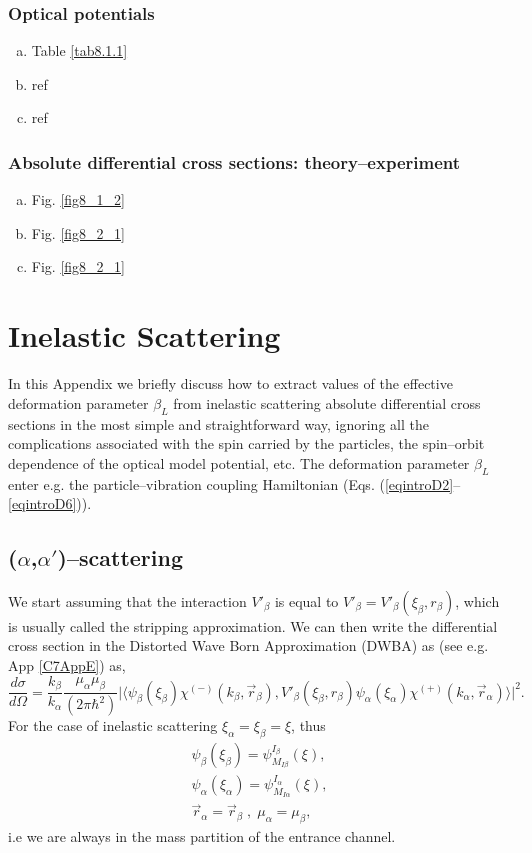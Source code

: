 \begin{subappendices}
\subsubsection{Optical potentials}
\begin{enumerate}[a)]
\item{Table \ref{tab8.1.1}}
\item{ref}
\item{ref}
\end{enumerate}
\subsubsection{Absolute differential cross sections: theory--experiment}
\begin{enumerate}[a)]
\item{Fig. \ref{fig8_1_2}}
\item{Fig. \ref{fig8_2_1}}
\item{Fig. \ref{fig8_2_1}}
\end{enumerate}
\section{Inelastic Scattering}\label{appintroE}
In this Appendix we briefly discuss   how to extract values of the effective deformation parameter $\beta_L$ from inelastic scattering absolute differential cross sections in the most simple and straightforward way, ignoring all the complications associated with the spin carried by the particles, the spin--orbit dependence of the optical model potential, etc. The deformation parameter $\beta_L$ enter e.g. the particle--vibration coupling Hamiltonian (Eqs. (\ref{eqintroD2}--\ref{eqintroD6})).
\subsection{($\alpha$,$\alpha'$)--scattering}
We start assuming that the interaction $V'_\beta$ is equal to $V'_\beta=V'_\beta(\xi_\beta,r_\beta)$, which is usually called the stripping approximation.
We can then write the differential cross section in the Distorted Wave Born Approximation (DWBA) as (see e.g. App \ref{C7AppE}) as,
\begin{equation}\label{eq4l1}
 \frac{d\sigma}{d\Omega}=\frac{k_\beta}{k_\alpha}\frac{\mu_\alpha \mu_\beta}{(2 \pi \hbar^2)}\vert\langle
\psi_\beta(\xi_\beta)\chi^{(-)}(k_\beta,\vec{r}_\beta),V'_\beta(\xi_\beta,r_\beta) \psi_\alpha(\xi_\alpha)\chi^{(+)}(k_\alpha,\vec{r}_\alpha)\rangle\vert^2.
\end{equation}
For the case of inelastic scattering $\xi_\alpha=\xi_\beta=\xi$, thus
\begin{subequations}
\begin{align}\label{eq4l2}
\psi_\beta(\xi_\beta)=\psi_{M_{I\beta}}^{I_\beta}(\xi),\\
\psi_\alpha(\xi_\alpha)=\psi_{M_{I\alpha}}^{I_\alpha}(\xi),\\
\vec{r}_\alpha=\vec{r}_\beta\;,\;\mu_\alpha =\mu_\beta,
\end{align}
\end{subequations}
i.e we are always in the mass partition of the entrance channel.


\end{subappendices}
